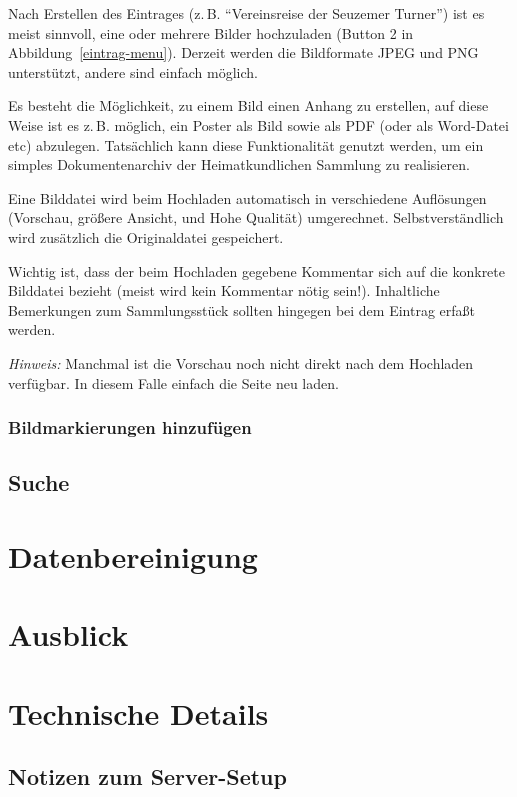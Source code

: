 \documentclass[12pt]{scrreprt}
\begin{document}
Nach Erstellen des Eintrages (z.\,B. ``Vereinsreise der Seuzemer
Turner'') ist es meist sinnvoll, eine oder mehrere Bilder
hochzuladen (Button {\color{red} 2} in Abbildung~\ref{eintrag-menu}).
Derzeit werden die Bildformate JPEG und PNG unterstützt,
andere sind einfach möglich.

Es besteht die Möglichkeit, zu einem Bild einen Anhang zu erstellen,
auf diese Weise ist es z.\,B. möglich, ein Poster als Bild sowie als
PDF (oder als Word-Datei etc) abzulegen. Tatsächlich kann diese
Funktionalität genutzt werden, um ein simples Dokumentenarchiv der
Heimatkundlichen Sammlung zu realisieren.

Eine Bilddatei wird beim Hochladen automatisch in verschiedene
Auflösungen (Vorschau, größere Ansicht, und Hohe Qualität)
umgerechnet. Selbstverständlich wird zusätzlich die Originaldatei
gespeichert.

Wichtig ist, dass der beim Hochladen gegebene Kommentar sich auf die
konkrete Bilddatei bezieht (meist wird kein Kommentar nötig
sein!). Inhaltliche Bemerkungen zum Sammlungsstück sollten hingegen
bei dem Eintrag erfaßt werden.


\textit{Hinweis:} Manchmal ist die Vorschau noch nicht direkt nach dem
Hochladen verfügbar. In diesem Falle einfach die Seite neu laden.

\subsection{Bildmarkierungen hinzufügen}



\section{Suche}

\chapter{Datenbereinigung}

\chapter{Ausblick}

\appendix

\chapter{Technische Details}

\section{Notizen zum Server-Setup}
\end{document}
